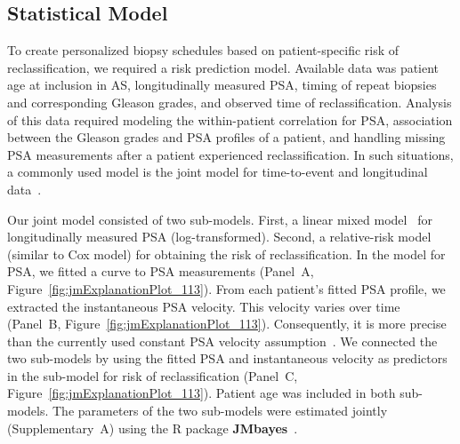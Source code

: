 \subsection{Statistical Model}
To create personalized biopsy schedules based on patient-specific risk of reclassification, we required a risk prediction model. Available data was patient age at inclusion in AS, longitudinally measured PSA, timing of repeat biopsies and corresponding Gleason grades, and observed time of reclassification. Analysis of this data required modeling the within-patient correlation for PSA, association between the Gleason grades and PSA profiles of a patient, and handling missing PSA measurements after a patient experienced reclassification. In such situations, a commonly used model is the joint model for time-to-event and longitudinal data~\citep{tomer2019,coley2017prediction,rizopoulos2012joint}.

Our joint model consisted of two sub-models. First, a linear mixed model~\citep{laird1982random} for longitudinally measured PSA (log-transformed). Second, a relative-risk model (similar to Cox model) for obtaining the risk of reclassification. In the model for PSA, we fitted a curve to PSA measurements (Panel~A, Figure~\ref{fig:jmExplanationPlot_113}). From each patient's fitted PSA profile, we extracted the instantaneous PSA velocity. This velocity varies over time (Panel~B, Figure~\ref{fig:jmExplanationPlot_113}). Consequently, it is more precise than the currently used constant PSA velocity assumption~\citep{vickers2009psavelocity}. We connected the two sub-models by using the fitted PSA and instantaneous velocity as predictors in the sub-model for risk of reclassification (Panel~C, Figure~\ref{fig:jmExplanationPlot_113}). Patient age was included in both sub-models. The parameters of the two sub-models were estimated jointly (Supplementary~A) using the R package \textbf{JMbayes}~\citep{rizopoulosJMbayes}. 

